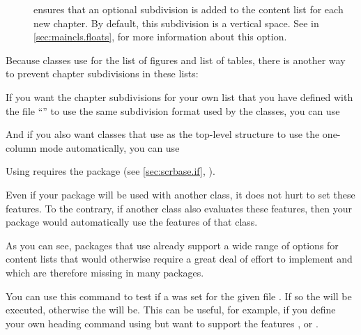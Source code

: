 \begin{description}
\item[] ensures that an optional subdivision is added
  to the content list for each new chapter. By default, this subdivision is a
  vertical space. See %
   in
  \autoref{sec:maincls.floats},  for more
  information about this option.
\end{description}
\begin{Example}
  Because \KOMAScript{} classes use  for the list of figures
  and list of tables, there is another way to prevent chapter subdivisions in
  these lists:
\begin{lstcode}
\end{lstcode}

  If you want the chapter subdivisions for your own list that you have defined
  with the file  ``'' to use the same subdivision
  format used by the \KOMAScript{} classes, you can use
\begin{lstcode}
\end{lstcode}
  And if you also want classes that use  as the
  top-level structure to use the one-column mode automatically, you can
  use
\begin{lstcode}
\end{lstcode}
  Using  requires the
   package (see \autoref{sec:scrbase.if},
  ).

  Even if your package will be used with another class, it
  does not hurt to set these features. To the contrary, if another class also
  evaluates these features, then your package would automatically use the
  features of that class.
\end{Example}
As you can see, packages that use  already support a wide
range of options for content lists that would otherwise require a great deal
of effort to implement and which are therefore missing in many packages.%
\EndIndexGroup


\begin{Declaration}
\end{Declaration}
You can use this command to test if a  was set for the given
file . If so the  will be executed,
otherwise the  will be. This can be useful, for example, if
you define your own heading command using
 but want to support the features
,  or .%
\EndIndexGroup


